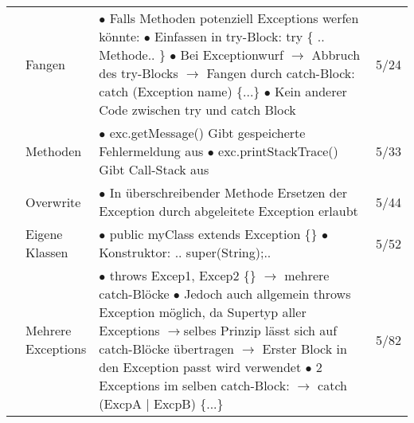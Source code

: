 \documentclass[11pt,a4paper]{article}
\begin{document}
\begin{center}
\begin{longtable}[h]{ | p{2.3cm} | p{2.3cm} | p{12.6cm} | p{1.2cm} | }
	& Fangen & \makecell[l]{$\bullet$ Falls Methoden potenziell Exceptions werfen könnte: \\
	\hspace{0.4cm} $\bullet$ Einfassen in try-Block: try \{ .. Methode.. \} \\
	\hspace{0.4cm} $\bullet$ Bei Exceptionwurf $\rightarrow$ Abbruch des try-Blocks \\ 
	$\rightarrow$ Fangen durch catch-Block: catch (Exception name) \{...\}\\ 
	\hspace{0.4cm} $\bullet$ Kein anderer Code zwischen try und catch Block} & 5/24 \\ \cline{2-4}
	
	& Methoden & \makecell[l]{$\bullet$ exc.getMessage() Gibt gespeicherte Fehlermeldung aus \\ 
	$\bullet$ exc.printStackTrace() Gibt Call-Stack aus}   & 5/33 \\ \cline{2-4}
	
	& Overwrite & \makecell[l]{$\bullet$ In überschreibender Methode Ersetzen der Exception durch \\ 
	\hspace{0.3cm}abgeleitete Exception erlaubt} & 5/44 \\ \cline{2-4}
	
	& \makecell[l]{Eigene \\ Klassen} & \makecell[l]{ $\bullet$ public myClass extends Exception \{\} \\ 
	$\bullet$ Konstruktor: .. super(String);.. } & 5/52 \\ \cline{2-4}
	
	& \makecell[l]{Mehrere \\ Exceptions}&  \makecell[l]{$\bullet$ throws Excep1, Excep2 \{\} \\ 
	\hspace{0.4cm} $\rightarrow$ mehrere catch-Blöcke \\ 
	$\bullet$ Jedoch auch allgemein throws Exception möglich, \\ \hspace{0.2cm} da Supertyp aller Exceptions \\ 
	\hspace{0.2cm} $\rightarrow$selbes Prinzip lässt sich auf catch-Blöcke übertragen \\ 
	\hspace{0.2cm} $\rightarrow$ Erster Block in den Exception passt wird verwendet \\	
	$\bullet$ 2 Exceptions im selben catch-Block: \\ \hspace{0.4cm} $\rightarrow$ catch (ExcpA | ExcpB) \{...\}}& 5/82\\ \cline{2-4}
	

\end{longtable}
\end{center}
\end{document}
